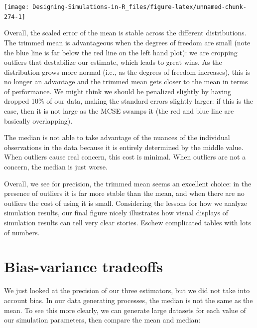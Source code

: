 \documentclass[
]{book}
\begin{document}
\begin{center}\texttt{[image: Designing-Simulations-in-R\_files/figure-latex/unnamed-chunk-274-1]} \end{center}

Overall, the scaled error of the mean is stable across the different distributions.
The trimmed mean is advantageous when the degrees of freedom are small (note the blue line is far below the red line on the left hand plot): we are cropping outliers that destabilize our estimate, which leads to great wins.
As the distribution grows more normal (i.e., as the degrees of freedom increases), this is no longer an advantage and the trimmed mean gets closer to the mean in terms of
performance.
We might think we should be penalized slightly by having dropped 10\% of our data, making the standard errors slightly larger: if this is the case, then it is not large as the MCSE swamps it (the red and blue line are basically overlapping).

The median is not able to take advantage of the nuances of the individual observations in the data because it is entirely determined by the middle value.
When outliers cause real concern, this cost is minimal. When outliers are not a concern, the median is just worse.

Overall, we see for precision, the trimmed mean seems an excellent choice: in the presence of
outliers it is far more stable than the mean, and when there are no outliers
the cost of using it is small.
Considering the lessons for how we analyze simulation results, our final figure nicely illustrates how
visual displays of simulation results can tell very clear stories.
Eschew complicated tables with lots of numbers.

\section{Bias-variance tradeoffs}\label{bias-variance-tradeoffs}

We just looked at the precision of our three estimators, but we did not take into account bias.
In our data generating processes, the median is not the same as the mean.
To see this more clearly, we can generate large datasets for each value of our simulation parameters, then compare the mean and median:
\end{document}
